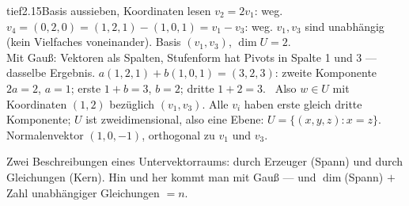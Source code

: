 \begin{loesungkarte}{tief}{2.15}{Basis aussieben, Koordinaten lesen}
$v_2 = 2v_1$: weg. $v_4 = (0, 2, 0) = (1, 2, 1) - (1, 0, 1) = v_1 - v_3$: weg. $v_1, v_3$ sind unabhängig (kein Vielfaches voneinander). Basis $(v_1, v_3)$, $\dim U = 2$. \\
Mit Gauß: Vektoren als Spalten, Stufenform hat Pivots in Spalte 1 und 3 --- dasselbe Ergebnis.
$a(1, 2, 1) + b(1, 0, 1) = (3, 2, 3)$: zweite Komponente $2a = 2$, $a = 1$; erste $1 + b = 3$, $b = 2$; dritte $1 + 2 = 3$. \checkmark\ Also $w\in U$ mit Koordinaten $(1, 2)$ bezüglich $(v_1, v_3)$.
Alle $v_i$ haben erste gleich dritte Komponente; $U$ ist zweidimensional, also eine Ebene: $U = \{(x, y, z)\colon x = z\}$. Normalenvektor $(1, 0, -1)$, orthogonal zu $v_1$ und $v_3$. \checkmark
{}
\begin{mitnehmen}\kastentext
Zwei Beschreibungen eines Untervektorraums: durch Erzeuger (Spann) und durch Gleichungen (Kern). Hin und her kommt man mit Gauß --- und $\dim$(Spann) $+$ Zahl unabhängiger Gleichungen $= n$.
\end{mitnehmen}
\end{loesungkarte}

